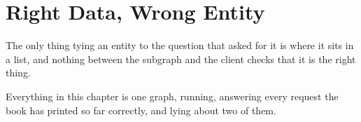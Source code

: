 \chapter{Right Data, Wrong Entity}
\label{ch:representation-order}

The only thing tying an entity to the question that asked for it is where it
sits in a list, and nothing between the subgraph and the client checks that it
is the right thing.

Everything in this chapter is one graph, running, answering every request the
book has printed so far correctly, and lying about two of them.






